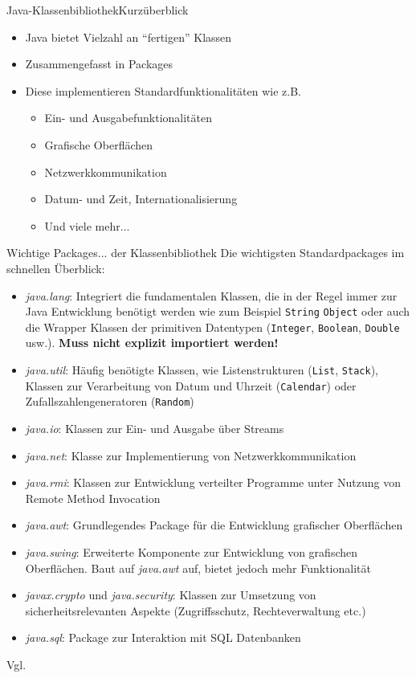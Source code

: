 \begin{frame}{Java-Klassenbibliothek}{Kurzüberblick}
	\begin{itemize}
		\item Java bietet Vielzahl an "`fertigen"' Klassen
		\item Zusammengefasst in Packages
		\item Diese implementieren Standardfunktionalitäten wie z.B.
		\begin{itemize}
			\item Ein- und Ausgabefunktionalitäten
			\item Grafische Oberflächen
			\item Netzwerkkommunikation
			\item Datum- und Zeit, Internationalisierung
			\item Und viele mehr...
		\end{itemize}
	\end{itemize}
\end{frame}

\begin{frame}[allowframebreaks]{Wichtige Packages}{... der Klassenbibliothek}
Die wichtigsten Standardpackages im schnellen Überblick:
	\begin{itemize}
		\item \textit{java.lang}: Integriert die fundamentalen Klassen, die in der Regel immer zur Java Entwicklung benötigt werden wie zum Beispiel \texttt{String} \texttt{Object} oder auch die Wrapper Klassen der primitiven
		Datentypen (\texttt{Integer}, \texttt{Boolean}, \texttt{Double} usw.). \textbf{Muss nicht explizit importiert werden!}
		\item \textit{java.util}: Häufig benötigte Klassen, wie Listenstrukturen (\texttt{List}, \texttt{Stack}), Klassen zur Verarbeitung von Datum und Uhrzeit (\texttt{Calendar}) oder Zufallszahlengeneratoren (\texttt{Random})
		\item \textit{java.io}: Klassen zur Ein- und Ausgabe über Streams
		\item \textit{java.net}: Klasse zur Implementierung von Netzwerkkommunikation
		\item \textit{java.rmi}: Klassen zur Entwicklung verteilter Programme unter Nutzung von Remote Method Invocation
		\item \textit{java.awt}: Grundlegendes Package für die Entwicklung grafischer Oberflächen
		\item \textit{java.swing}: Erweiterte Komponente zur Entwicklung von grafischen Oberflächen. Baut auf \textit{java.awt} auf, bietet jedoch mehr Funktionalität
		\item \textit{javax.crypto} und \textit{java.security}: Klassen zur Umsetzung von sicherheitsrelevanten Aspekte (Zugriffsschutz, Rechteverwaltung etc.)
		\item \textit{java.sql}: Package zur Interaktion mit SQL Datenbanken
	\end{itemize}
    
    Vgl. \cite{ullenboom2007java}
\end{frame}

